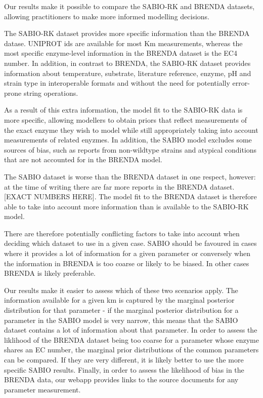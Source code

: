 \documentclass[11pt]{article}
\begin{document}
Our results make it possible to compare the SABIO-RK and BRENDA datasets,
allowing practitioners to make more informed modelling decisions.

The SABIO-RK dataset provides more specific information than the BRENDA
datase. UNIPROT ids are available for most Km measurements, whereas the most
specific enzyme-level information in the BRENDA dataset is the EC4 number. In
addition, in contrast to BRENDA, the SABIO-RK dataset provides information about
temperature, substrate, literature reference, enzyme, pH and strain type in
interoperable formats and without the need for potentially error-prone string
operations.

As a result of this extra information, the model fit to the SABIO-RK data is
more specific, allowing modellers to obtain priors that reflect measurements of
the exact enzyme they wish to model while still appropriately taking into
account measurements of related enyzmes. In addition, the SABIO model excludes
some sources of bias, such as reports from non-wildtype strains and atypical
conditions that are not accounted for in the BRENDA model.

The SABIO dataset is worse than the BRENDA dataset in one respect, however: at
the time of writing there are far more reports in the BRENDA dataset. [EXACT
NUMBERS HERE]. The model fit to the BRENDA dataset is therefore able to take
into account more information than is available to the SABIO-RK model.

There are therefore potentially conflicting factors to take into account when
deciding which dataset to use in a given case. SABIO should be favoured in cases
where it provides a lot of information for a given parameter or conversely when
the information in BRENDA is too coarse or likely to be biased. In other cases
BRENDA is likely preferable.

Our results make it easier to assess which of these two scenarios apply. The
information available for a given km is captured by the marginal posterior
distribution for that parameter - if the marginal posterior distribution for a
parameter in the SABIO model is very narrow, this means that the SABIO dataset
contains a lot of information about that parameter. In order to assess the
liklihood of the BRENDA dataset being too coarse for a parameter whose enzyme
shares an EC number, the marginal prior distributions of the common parameters
can be compared. If they are very different, it is likely better to use the more
specific SABIO results. Finally, in order to assess the likelihood of bias in
the BRENDA data, our webapp provides links to the source documents for any
parameter measurement.
\end{document}

